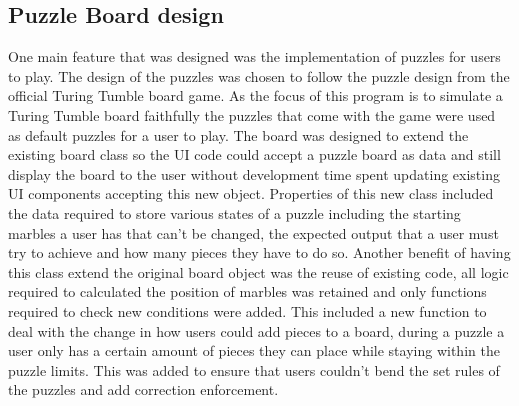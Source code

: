 \documentclass{l4proj}
\begin{document}
\subsection{Puzzle Board design}
One main feature that was designed was the implementation of puzzles for users to play. The design of the puzzles was chosen to follow the puzzle design from the official Turing Tumble board game. As the focus of this program is to simulate a Turing Tumble board faithfully the puzzles that come with the game were used as default puzzles for a user to play. The board was designed to extend the existing board class so the UI code could accept a puzzle board as data and still display the board to the user without development time spent updating existing UI components accepting this new object. Properties of this new class included the data required to store various states of a puzzle including the starting marbles a user has that can't be changed, the expected output that a user must try to achieve and how many pieces they have to do so. Another benefit of having this class extend the original board object was the reuse of existing code, all logic required to calculated the position of marbles was retained and only functions required to check new conditions were added. This included a new function to deal with the change in how users could add pieces to a board, during a puzzle a user only has a certain amount of pieces they can place while staying within the puzzle limits. This was added to ensure that users couldn't bend the set rules of the puzzles and add correction enforcement.   
\end{document}
